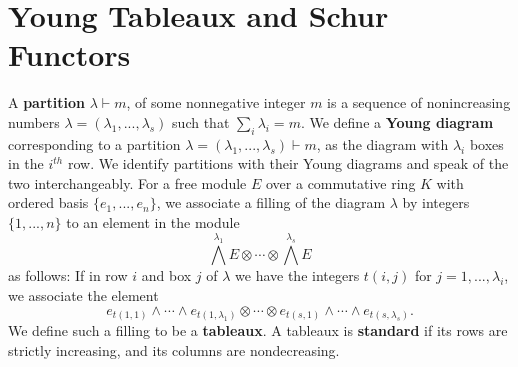 \documentclass[11pt,oneside]{amsbook}
\numberwithin{equation}{section}
\theoremstyle{plain}
\theoremstyle{definition}
\theoremstyle{remark}
\begin{document}
		\section{Young Tableaux and Schur Functors}\label{Young Tableaux}
		A \textbf{partition} $\lambda \vdash m$, of some nonnegative integer $m$ is a sequence of nonincreasing numbers $\lambda = (\lambda_1, ..., \lambda_s)$ such that $\sum_i \lambda_i = m$. We define a \textbf{Young diagram} corresponding to a partition $\lambda = (\lambda_1, ..., \lambda_s) \vdash m$, as the diagram with $\lambda_i$ boxes in the $i^{th}$ row. We identify partitions with their Young diagrams and speak of the two interchangeably. For a free module $E$ over a commutative ring $K$ with ordered basis $\{e_1, ..., e_n\}$, we associate a filling of the diagram $\lambda$ by integers $\{1, ..., n\}$ to an element in the module
		\[ \bigwedge^{\lambda_1}E \otimes \cdots \otimes \bigwedge^{\lambda_s}E \]
		as follows: If in row $i$ and box $j$ of $\lambda$ we have the integers $t(i, j)$ for $j=1, ..., \lambda_i$, we associate the element
		\[ e_{t(1,1)} \wedge \cdots \wedge e_{t(1,\lambda_1)} \otimes  \cdots \otimes e_{t(s,1)} \wedge \cdots \wedge e_{t(s, \lambda_s)}.\]
		We define such a filling to be a \textbf{tableaux}. A tableaux is \textbf{standard} if its rows are strictly increasing, and its columns are nondecreasing. 
		
\end{document}
